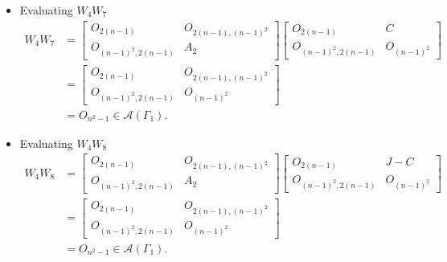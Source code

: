 \begin{itemize}
    \item Evaluating $W_4W_7$
    \begin{align*}
        W_4W_7
        &= \begin{bmatrix}
            O_{2(n-1)} & O_{2(n-1), (n-1)^2} \\
            O_{(n-1)^2, 2(n-1)} & A_2
        \end{bmatrix}\begin{bmatrix}
            O_{2(n-1)} & C \\
            O_{(n-1)^2, 2(n-1)} & O_{(n-1)^2}
        \end{bmatrix}\\
        &= \begin{bmatrix}
            O_{2(n-1)} & O_{2(n-1), (n-1)^2} \\
            O_{(n-1)^2, 2(n-1)} & O_{(n-1)^2}
        \end{bmatrix}\\
        &= O_{n^2-1}\in\mathcal{A}(\Gamma_1).
    \end{align*}
    
    \item Evaluating $W_4W_8$
    \begin{align*}
        W_4W_8
        &= \begin{bmatrix}
            O_{2(n-1)} & O_{2(n-1), (n-1)^2} \\
            O_{(n-1)^2, 2(n-1)} & A_2
        \end{bmatrix}\begin{bmatrix}
            O_{2(n-1)} & J-C \\
            O_{(n-1)^2, 2(n-1)} & O_{(n-1)^2}
        \end{bmatrix}\\
        &= \begin{bmatrix}
            O_{2(n-1)} & O_{2(n-1), (n-1)^2} \\
            O_{(n-1)^2, 2(n-1)} & O_{(n-1)^2}
        \end{bmatrix}\\
        &= O_{n^2-1}\in\mathcal{A}(\Gamma_1).
    \end{align*}
    

\end{itemize}
